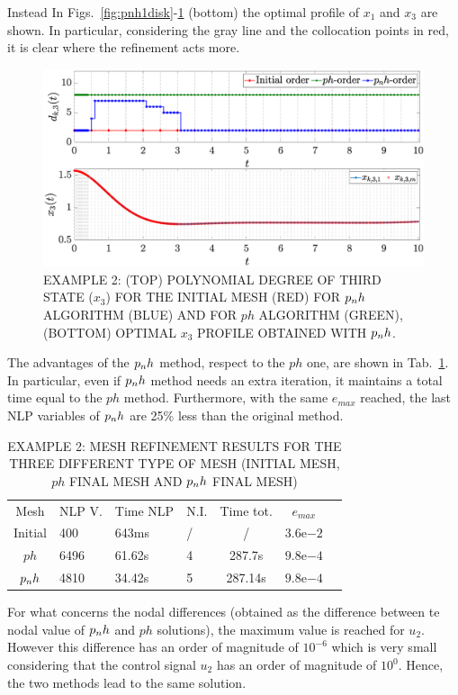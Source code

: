 Instead In Figs.~\ref{fig:pnh1disk}-\ref{fig:pnh2disk} (bottom) the optimal profile of $x_1$ and $x_3$ are shown. In particular, considering the gray line and the collocation points in red, it is clear where the refinement acts more.
\begin{figure}[t]
	\centering
	\includegraphics[trim={1cm 0cm 2cm 1.05cm},clip,width=1.\columnwidth]{Img/pnh2_disk2}
	\caption{EXAMPLE 2: (TOP) POLYNOMIAL DEGREE OF THIRD STATE ($x_{3}$) FOR THE INITIAL MESH (RED) FOR $p_{n}h$ ALGORITHM (BLUE) AND FOR $ph$ ALGORITHM (GREEN), (BOTTOM)
	OPTIMAL $x_3$ PROFILE OBTAINED WITH $p_{n}h$.}
	\label{fig:pnh2disk}
\end{figure}
The advantages of the $p_{n}h$ method, respect to the $ph$ one, are shown in Tab.~\ref{tab:tabledisk}. In particular, even if $p_{n}h$ method needs an extra iteration, it maintains a total time equal to the $ph$ method. Furthermore, with the same $e_{max}$ reached, the last NLP variables of $p_{n}h$ are 25\% less than the original method.
\begin{table}[t]
	\caption{EXAMPLE 2: MESH REFINEMENT RESULTS FOR THE THREE DIFFERENT TYPE OF MESH (INITIAL MESH, $ph$ FINAL MESH AND $p_{n}h$ FINAL MESH)}
	\begin{center}
		\label{tab:tabledisk}
		\begin{tabular}{c l l l c c c}
			& & \\ %
			\hline
			Mesh & NLP V. & Time NLP & N.I. & Time tot. & $e_{max}$ \\
			\hline
			Initial & 400 & 643ms & / & / &  $3.6\mathrm{e}{-2}$\\
			$ph$  & 6496 & 61.62s & 4 & 287.7s & $9.8\mathrm{e}{-4}$ \\
			$p_{n}h$ & 4810 & 34.42s & 5 & 287.14s & $9.8\mathrm{e}{-4}$ \\
			\hline
		\end{tabular}
	\end{center}
\end{table}
For what concerns the nodal differences (obtained as the difference between te nodal value of $p_{n}h$ and $ph$ solutions), the maximum value is reached for $u_2$. However this difference has an order of magnitude of $10^{-6}$ which is very small considering that the control signal $u_2$ has an order of magnitude of $10^0$. Hence, the two methods lead to the same solution.
